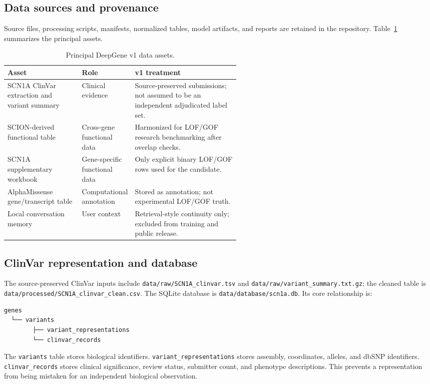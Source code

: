 \documentclass[12pt,a4paper]{article}
\newcommand{\code}[1]{\nolinkurl{#1}}
\begin{document}
\subsection{Data sources and provenance}
Source files, processing scripts, manifests, normalized tables, model artifacts, and reports are retained in the repository. Table~\ref{tab:data} summarizes the principal assets.

\begin{table}[H]
\centering
\small
\caption{Principal DeepGene v1 data assets.}
\label{tab:data}
\begin{tabularx}{\linewidth}{p{0.32\linewidth}p{0.22\linewidth}X}
\toprule
Asset & Role & v1 treatment\\
\midrule
SCN1A ClinVar extraction and variant summary & Clinical evidence & Source-preserved submissions; not assumed to be an independent adjudicated label set.\\
SCION-derived functional table & Cross-gene functional data & Harmonized for LOF/GOF research benchmarking after overlap checks.\\
SCN1A supplementary workbook & Gene-specific functional data & Only explicit binary LOF/GOF rows used for the candidate.\\
AlphaMissense gene/transcript table & Computational annotation & Stored as annotation; not experimental LOF/GOF truth.\\
Local conversation memory & User context & Retrieval-style continuity only; excluded from training and public release.\\
\bottomrule
\end{tabularx}
\end{table}

\subsection{ClinVar representation and database}
The source-preserved ClinVar inputs include \code{data/raw/SCN1A\_clinvar.tsv} and \code{data/raw/variant\_summary.txt.gz}; the cleaned table is \code{data/processed/SCN1A\_clinvar\_clean.csv}. The SQLite database is \code{data/database/scn1a.db}. Its core relationship is:
\begin{verbatim}
genes
  └── variants
        ├── variant_representations
        └── clinvar_records
\end{verbatim}
The \code{variants} table stores biological identifiers. \code{variant\_representations} stores assembly, coordinates, alleles, and dbSNP identifiers. \code{clinvar\_records} stores clinical significance, review status, submitter count, and phenotype descriptions. This prevents a representation from being mistaken for an independent biological observation.
\end{document}
